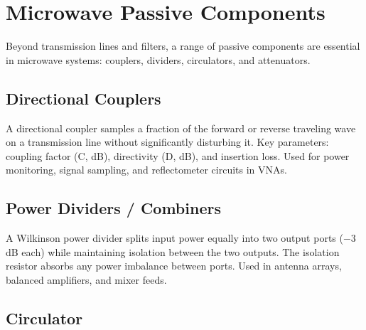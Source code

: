 \section{Microwave Passive Components}\label{sec:wiki_microwave_components}



Beyond transmission lines and filters, a range of passive components are essential in microwave systems: couplers, dividers, circulators, and attenuators.

				

\subsection{Directional Couplers}

				


				

A directional coupler samples a fraction of the forward or reverse traveling wave on a transmission line without significantly disturbing it. Key parameters: coupling factor (C, dB), directivity (D, dB), and insertion loss. Used for power monitoring, signal sampling, and reflectometer circuits in VNAs.


				

\subsection{Power Dividers / Combiners}

				

A Wilkinson power divider splits input power equally into two output ports (−3 dB each) while maintaining isolation between the two outputs. The isolation resistor absorbs any power imbalance between ports. Used in antenna arrays, balanced amplifiers, and mixer feeds.

				

\subsection{Circulator}

